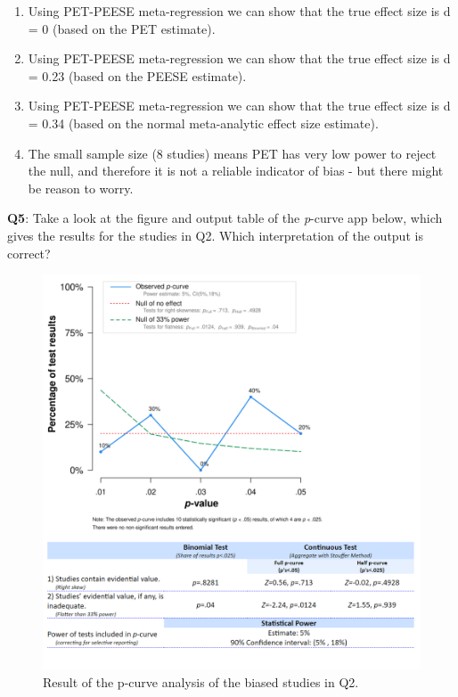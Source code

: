 \documentclass[
  oneside]{book}
\providecommand{\tightlist}{%
  \setlength{\itemsep}{0pt}\setlength{\parskip}{0pt}}
\begin{document}
\begin{enumerate}
\def\labelenumi{\Alph{enumi})}
\tightlist
\item
  Using PET-PEESE meta-regression we can show that the true effect size is d = 0 (based on the PET estimate).
\item
  Using PET-PEESE meta-regression we can show that the true effect size is d = 0.23 (based on the PEESE estimate).
\item
  Using PET-PEESE meta-regression we can show that the true effect size is d = 0.34 (based on the normal meta-analytic effect size estimate).
\item
  The small sample size (8 studies) means PET has very low power to reject the null, and therefore it is not a reliable indicator of bias - but there might be reason to worry.
\end{enumerate}

\textbf{Q5}: Take a look at the figure and output table of the \emph{p}-curve app below, which gives the results for the studies in Q2. Which interpretation of the output is correct?

\begin{figure}

{\centering \includegraphics[width=1\linewidth]{images/pcurveresultq5} 

}

\caption{Result of the p-curve analysis of the biased studies in Q2.}\label{fig:pcurveresultq5}
\end{figure}
\end{document}
